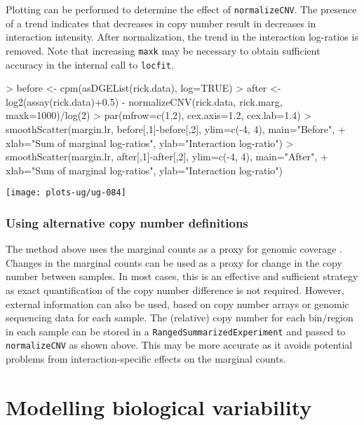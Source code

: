 \documentclass[12pt]{report}
\renewenvironment{Schunk}{\vspace{0pt}}{\vspace{0pt}}
\newcommand{\code}[1]{{\small\texttt{#1}}}
\begin{document}
Plotting can be performed to determine the effect of \code{normalizeCNV}.
The presence of a trend indicates that decreases in copy number result in decreases in interaction intensity.
After normalization, the trend in the interaction log-ratios is removed.
Note that increasing \code{maxk} may be necessary to obtain sufficient accuracy in the internal call to \code{locfit}.

\begin{Schunk}
\begin{Sinput}
> before <- cpm(asDGEList(rick.data), log=TRUE)
> after <- log2(assay(rick.data)+0.5) - normalizeCNV(rick.data, rick.marg, maxk=1000)/log(2)
> par(mfrow=c(1,2), cex.axis=1.2, cex.lab=1.4)
> smoothScatter(margin.lr, before[,1]-before[,2], ylim=c(-4, 4), main="Before",
+     xlab="Sum of marginal log-ratios", ylab="Interaction log-ratio")
> smoothScatter(margin.lr, after[,1]-after[,2], ylim=c(-4, 4), main="After",
+     xlab="Sum of marginal log-ratios", ylab="Interaction log-ratio")
\end{Sinput}
\end{Schunk}

\begin{center}
\texttt{[image: plots-ug/ug-084]}
\end{center}

\subsection{Using alternative copy number definitions}
The method above uses the marginal counts as a proxy for genomic coverage \cite{imakaev2012iterative}.
Changes in the marginal counts can be used as a proxy for change in the copy number between samples.     
In most cases, this is an effective and sufficient strategy as exact quantification of the copy number difference is not required.
However, external information can also be used, based on copy number arrays or genomic sequencing data for each sample.
The (relative) copy number for each bin/region in each sample can be stored in a \code{RangedSummarizedExperiment} and passed to \code{normalizeCNV} as shown above.
This may be more accurate as it avoids potential problems from interaction-specific effects on the marginal counts.

\chapter{Modelling biological variability}
\end{document}
